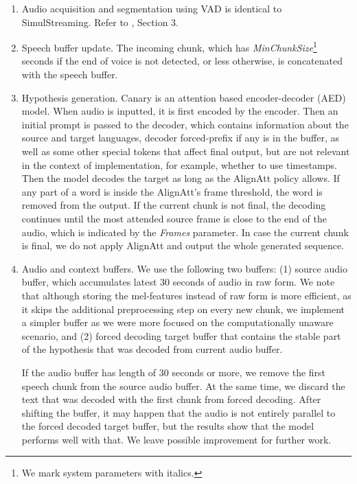 \documentclass[11pt]{article}
\begin{document}
\begin{enumerate}
\item[1.-2.] Audio acquisition and segmentation using VAD is identical to SimulStreaming. Refer to \citet{machacek-polak-2025-simultaneous}, Section 3.

\item[3.] Speech buffer update. The incoming chunk, which has \textit{MinChunkSize}\footnote{We mark system parameters with italics.} seconds if the end of voice is not detected, or less otherwise, is concatenated with the speech buffer.

\item[4.] Hypothesis generation. Canary is an attention based encoder-decoder (AED) model. When audio is inputted, it is first encoded by the encoder. Then an initial prompt is passed to the decoder, which contains information about the source and target languages, decoder forced-prefix if any is in the buffer, as well as some other special tokens that affect final output, but are not relevant in the context of implementation, for example, whether to use timestamps. Then the model decodes the target as long as the AlignAtt policy allows. If any part of a word is inside the AlignAtt's frame threshold, the word is removed from the output. If the current chunk is not final, the decoding continues until the most attended source frame is close to the end of the audio, which is indicated by the \textit{Frames} parameter. In case the current chunk is final, we do not apply AlignAtt and output the whole generated sequence. 

\item[5.] Audio and context buffers. We use the following two buffers: (1) source audio buffer, which accumulates latest 30 seconds of audio in raw form. We note that although storing the mel-features instead of raw form is more efficient, as it skips the additional preprocessing step on every new chunk, we implement a simpler buffer as we were more focused on the computationally unaware scenario, and (2) forced decoding target buffer that contains the stable part of the hypothesis that was decoded from current audio buffer.

If the audio buffer has length of 30 seconds or more, we remove the first speech chunk from the source audio buffer. At the same time, we discard the text that was decoded with the first chunk from forced decoding. After shifting the buffer, it may happen that the audio is not entirely parallel to the forced decoded target buffer, but the results show that the model performs well with that. We leave possible improvement for further work.


\end{enumerate}
\end{document}

